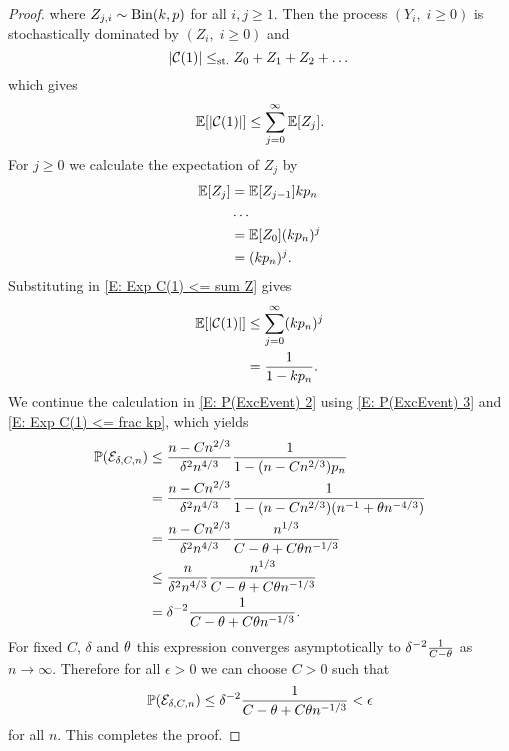 \begin{proof}
	where $Z_{j,i} \sim\operatorname*{Bin}(k,p)$ for all $i,j \geq 1$.
	Then the process $(Y_i, \; i\geq 0)$ is stochastically dominated by 
	$(Z_i, \; i\geq 0)$ and
	\begin{equation}
	|\mathcal{C}(1)| \leq_{\text{st.}} Z_0 + Z_1 + Z_2 + \dots
	\end{equation}
	which gives
	\begin{equation} \label{E: Exp C(1) <= sum Z}
		\mathbb{E}[|\mathcal{C}(1)|] \leq \sum_{j=0}^{\infty}\mathbb{E}[Z_j].
	\end{equation}	
	For $j\geq0$ we calculate the expectation of $Z_j$ by
	\begin{equation}
	\begin{aligned}
	\mathbb{E}[Z_j] 
	&= \mathbb{E}[Z_{j-1}]k p_n \\
	&\dots \\
	&= \mathbb{E}[Z_0](kp_n)^j \\
	&= (kp_n)^j.
	\end{aligned}		
	\end{equation}
	Substituting in \eqref{E: Exp C(1) <= sum Z} gives
	\begin{equation} \label{E: Exp C(1) <= frac kp}
	\begin{aligned}
	\mathbb{E}[|\mathcal{C}(1)|] 
	&\leq \sum_{j=0}^{\infty} (k p_n)^j \\
	&= \frac{1}{1- kp_n}.
	\end{aligned}		
	\end{equation}
	We continue the calculation in \eqref{E: P(ExcEvent) 2} using \eqref{E: P(ExcEvent) 3} and \eqref{E: Exp C(1) <= frac kp},
	which yields
	\begin{equation}
	\begin{aligned}
	\mathbb{P}(\mathcal{E}_{\delta, C, n}) 
	&\leq \frac{n-Cn^{2 / 3}}{\delta^2 n^{4 / 3}} \frac{1}{1-(n-Cn^{2 / 3}) p_n} \\
	&= \frac{n-Cn^{2 / 3}}{\delta^2 n^{4 / 3}} \frac{1}{1-(n-Cn^{2 / 3})(n^{-1} + \theta n^{-4 / 3})} \\
	&= \frac{n-Cn^{2 / 3}}{\delta^2 n^{4 / 3}} \frac{n^{1 / 3}}{C-\theta+C\theta n^{-1 / 3}} \\
	&\leq \frac{n}{\delta^2 n^{4 / 3}} \frac{n^{1 / 3}}{C-\theta+C\theta n^{-1 / 3}} \\
	&= \delta^{-2} \frac{1}{C-\theta+C\theta n^{-1 / 3}}.
	\end{aligned}
	\end{equation}
	For fixed $C$, $\delta$ and $\theta$
	this expression converges asymptotically to $\delta^{-2} \frac{1}{C-\theta}$ as $n \rightarrow \infty$.
	Therefore for all $\epsilon>0$ we can choose $C>0$ such that
	\begin{equation}
		\mathbb{P}(\mathcal{E}_{\delta, C, n}) \leq \delta^{-2} \frac{1}{C-\theta+C\theta n^{-1 / 3}} < \epsilon
	\end{equation}
	for all $n$. 
	This completes the proof.
\end{proof}

